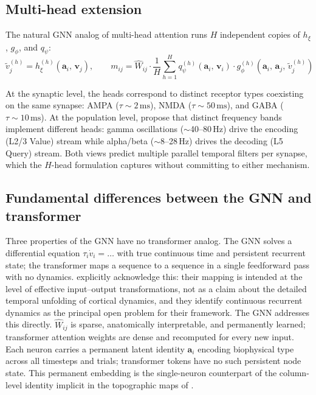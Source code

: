 \documentclass[11pt]{article}
\begin{document}
\subsection*{Multi-head extension}

The natural GNN analog of multi-head attention \citep{vaswani2017} runs
$H$ independent copies of $h_\xi$, $g_\phi$, and $q_\psi$:
\begin{equation}
\tilde{v}_j^{(h)} = h_\xi^{(h)}\!\left(\mathbf{a}_i,\,\mathbf{v}_j\right),
\qquad
m_{ij} = \hat{W}_{ij} \cdot \frac{1}{H}\sum_{h=1}^{H}
q_\psi^{(h)}\!\left(\mathbf{a}_i,\,\mathbf{v}_i\right) \cdot
g_\phi^{(h)}\!\left(\mathbf{a}_i,\,\mathbf{a}_j,\,\tilde{v}_j^{(h)}\right)
\end{equation}

At the synaptic level, the heads correspond to distinct receptor types
coexisting on the same synapse: AMPA ($\tau \sim 2\,\mathrm{ms}$),
NMDA ($\tau \sim 50\,\mathrm{ms}$), and GABA ($\tau \sim 10\,\mathrm{ms}$).
At the population level, \citet{konig2026} propose that distinct frequency
bands implement different heads: gamma oscillations ($\sim$40--80\,Hz) drive
the encoding (L2/3 Value) stream while alpha/beta ($\sim$8--28\,Hz) drives
the decoding (L5 Query) stream.
Both views predict multiple parallel temporal filters per synapse, which
the $H$-head formulation captures without committing to either mechanism.

\subsection*{Fundamental differences between the GNN and transformer}

Three properties of the GNN have no transformer analog.
The GNN solves a differential equation $\tau_i \dot{v}_i = \ldots$ with true
continuous time and persistent recurrent state; the transformer maps a
sequence to a sequence in a single feedforward pass with no dynamics.
\citet{konig2026} explicitly acknowledge this: their mapping is intended at
the level of effective input--output transformations, not as a claim about
the detailed temporal unfolding of cortical dynamics, and they identify
continuous recurrent dynamics as the principal open problem for their
framework. The GNN addresses this directly.
$\hat{W}_{ij}$ is sparse, anatomically interpretable, and permanently
learned; transformer attention weights are dense and recomputed for every
new input.
Each neuron carries a permanent latent identity $\mathbf{a}_i$ encoding
biophysical type across all timesteps and trials; transformer tokens have
no such persistent node state. This permanent embedding is the single-neuron
counterpart of the column-level identity implicit in the topographic maps
of \citet{konig2026}.
\end{document}
